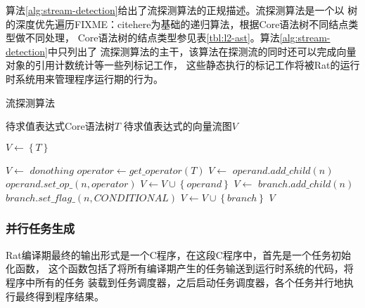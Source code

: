 算法\ref{alg:stream-detection}给出了流探测算法的正规描述。流探测算法是一个以
树的深度优先遍历FIXME：citehere为基础的递归算法，根据Core语法树不同结点类型做不同处理，
Core语法树的结点类型参见表\ref{tbl:l2-ast}。算法\ref{alg:stream-detection}中只列出了
流探测算法的主干，该算法在探测流的同时还可以完成向量对象的引用计数统计等一些列标记工作，
这些静态执行的标记工作将被Rat的运行时系统用来管理程序运行期的行为。
\begin{algorithm}[htbp]
  \caption{流探测算法}
  \label{alg:stream-detection}
  \begin{algorithmic}[1]
    \Require 待求值表达式Core语法树$T$
    \Ensure 待求值表达式的向量流图$V$

      \State $V \leftarrow \left\{ T \right\}$
      \State \Return {}
    \EndFunction

      \State $V \leftarrow$ 
      \State $donothing$
      \State $operator \leftarrow get\_operator(T)$
      \State $V \leftarrow$ 
       {
        \State $operand.add\_child(n)$
        \State $operand.set\_op\_(n, operator)$
        \State $V \leftarrow V \cup \left\{ operand \right\}$
        \EndIf
      }
      \EndFor
      \State $V \leftarrow$ 
       {
        \State $branch.add\_child(n)$
        \State $branch.set\_flag\_(n, CONDITIONAL)$
        \State $V \leftarrow V \cup \left\{ branch \right\}$
        \EndIf
      }
      \EndFor
      \EndIf
      \State \Return $V$
    \EndFunction
  \end{algorithmic}
\end{algorithm}

\subsubsection{并行任务生成}
Rat编译期最终的输出形式是一个C程序，在这段C程序中，首先是一个任务初始化函数，
这个函数包括了将所有编译期产生的任务输送到运行时系统的代码，将程序中所有的任务
装载到任务调度器，之后启动任务调度器，各个任务并行地执行最终得到程序结果。


